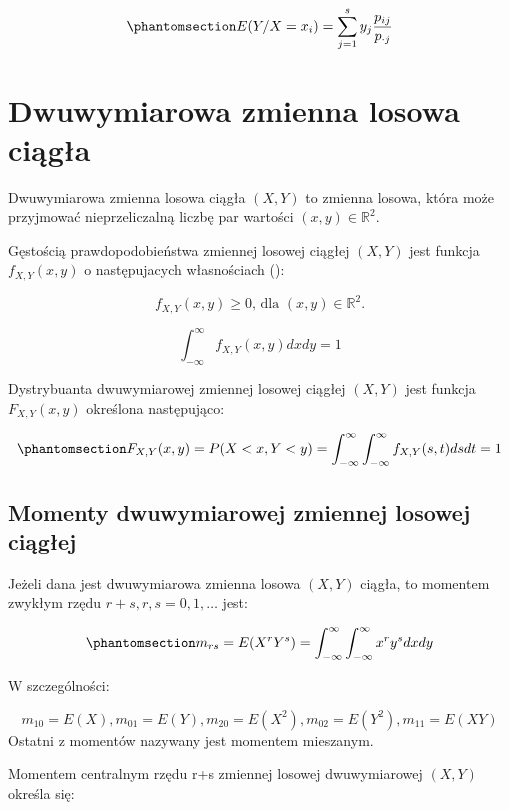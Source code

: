 \documentclass[
  letterpaper,
  DIV=11,
  numbers=noendperiod]{scrreprt}
\begin{document}
\begin{equation}\phantomsection\label{eq-war_EY}{E(Y/X=x_i)=\sum_{j=1}^sy_j\frac{p_{ij}}{p_{\cdot j}}}\end{equation}

\section{Dwuwymiarowa zmienna losowa
ciągła}\label{dwuwymiarowa-zmienna-losowa-ciux105gux142a}

Dwuwymiarowa zmienna losowa ciągła \((X,Y)\) to zmienna losowa, która
może przyjmować nieprzeliczalną liczbę par wartości
\((x,y) \in \mathbb{R}^2\).

Gęstością prawdopodobieństwa zmiennej losowej ciągłej \((X,Y)\) jest
funkcja \(f_{X,Y}(x,y)\) o następujacych własnościach
():

\[f_{X,Y}(x,y) \ge 0 \text{, dla } (x,y) \in \mathbb{R}^2.\]

\[ \int_{-\infty}^\infty f_{X,Y}(x,y)dxdy=1\]

Dystrybuanta dwuwymiarowej zmiennej losowej ciągłej \((X,Y)\) jest
funkcja \(F_{X,Y}(x,y)\) określona następująco:

\begin{equation}\phantomsection\label{eq-dys_2wcg}{ F_{X,Y}(x,y)=P(X < x, Y <y)=\int_{-\infty}^\infty \int_{-\infty}^\infty f_{X,Y}(s,t)dsdt=1}\end{equation}

\subsection{Momenty dwuwymiarowej zmiennej losowej
ciągłej}\label{momenty-dwuwymiarowej-zmiennej-losowej-ciux105gux142ej}

Jeżeli dana jest dwuwymiarowa zmienna losowa \((X,Y)\) ciągła, to
momentem zwykłym rzędu \(r+s, r, s = 0, 1, \ldots\) jest:

\begin{equation}\phantomsection\label{eq-mom_zw_cg}{ m_{rs}=E(X^rY^s)=\int_{-\infty}^{\infty}\int_{-\infty}^{\infty} x^r y^s dxdy}\end{equation}

W szczególności:

\[ m_{10}=E(X), m_{01}=E(Y), m_{20}=E(X^2), m_{02}=E(Y^2), m_{11}=E(XY)\]
Ostatni z momentów nazywany jest momentem mieszanym.

Momentem centralnym rzędu r+s zmiennej losowej dwuwymiarowej \((X,Y)\)
określa się:
\end{document}
